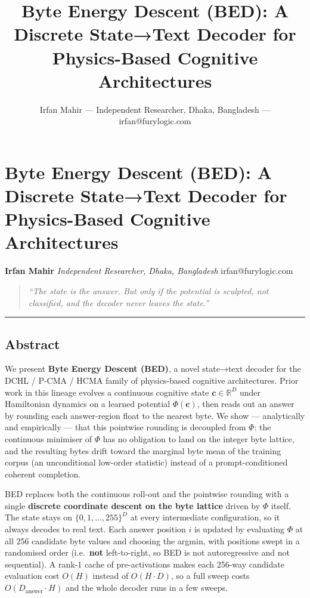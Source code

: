\documentclass[
  11pt,
  a4paper,
]{article}
\title{Byte Energy Descent (BED): A Discrete State→Text Decoder for
Physics-Based Cognitive Architectures}
\author{Irfan Mahir --- Independent Researcher, Dhaka, Bangladesh ---
irfan@furylogic.com}
\date{}
\begin{document}
\maketitle

{
\hypersetup{linkcolor=}
\setcounter{tocdepth}{3}
\tableofcontents
}
\section{Byte Energy Descent (BED): A Discrete State→Text Decoder for
Physics-Based Cognitive
Architectures}\label{byte-energy-descent-bed-a-discrete-statetext-decoder-for-physics-based-cognitive-architectures}

\textbf{Irfan Mahir} \emph{Independent Researcher, Dhaka, Bangladesh}
irfan@furylogic.com

\begin{quote}
\emph{``The state is the answer. But only if the potential is sculpted,
not classified, and the decoder never leaves the state.''}
\end{quote}

\begin{center}\rule{0.5\linewidth}{0.5pt}\end{center}

\subsection{Abstract}\label{abstract}

We present \textbf{Byte Energy Descent (BED)}, a novel state→text
decoder for the DCHL / P-CMA / HCMA family of physics-based cognitive
architectures. Prior work in this lineage evolves a continuous cognitive
state \(\mathbf{c} \in \mathbb{R}^D\) under Hamiltonian dynamics on a
learned potential \(\Phi(\mathbf{c})\), then reads out an answer by
rounding each answer-region float to the nearest byte. We show ---
analytically and empirically --- that this pointwise rounding is
decoupled from \(\Phi\): the continuous minimiser of \(\Phi\) has no
obligation to land on the integer byte lattice, and the resulting bytes
drift toward the marginal byte mean of the training corpus (an
unconditional low-order statistic) instead of a prompt-conditioned
coherent completion.

BED replaces both the continuous roll-out and the pointwise rounding
with a single \textbf{discrete coordinate descent on the byte lattice}
driven by \(\Phi\) itself. The state stays on \(\{0,1,\dots,255\}^D\) at
every intermediate configuration, so it always decodes to real text.
Each answer position \(i\) is updated by evaluating \(\Phi\) at all 256
candidate byte values and choosing the argmin, with positions swept in a
randomised order (i.e.~\textbf{not} left-to-right, so BED is not
autoregressive and not sequential). A rank-1 cache of pre-activations
makes each 256-way candidate evaluation cost \(O(H)\) instead of
\(O(H \cdot D)\), so a full sweep costs \(O(D_{\text{answer}} \cdot H)\)
and the whole decoder runs in a few sweeps.
\end{document}
